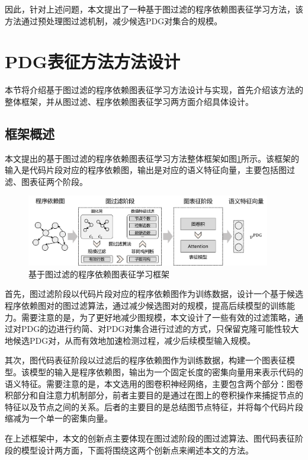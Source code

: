 因此，针对上述问题，本文提出了一种基于图过滤的程序依赖图表征学习方法，该方法通过预处理图过滤机制，减少候选PDG对集合的规模。

\section{PDG表征方法方法设计}
\label{sec:PDG}
本节将介绍基于图过滤的程序依赖图表征学习方法设计与实现，首先介绍该方法的整体框架，并从图过滤、程序依赖图表征学习两方面介绍具体设计。 

\subsection{框架概述}
\label{subsec:PDGOverview}
本文提出的基于图过滤的程序依赖图表征学习方法整体框架如图\ref{fig:pdgframework}所示。该框架的输入是代码片段对应的程序依赖图，输出是对应的语义特征向量，主要包括图过滤、图表征两个阶段。

\begin{figure}[H]
  \centering
  \includegraphics[width=0.95\textwidth]{figures/pdgframework.png}
  \caption{基于图过滤的程序依赖图表征学习框架}\label{fig:pdgframework}
\end{figure}

首先，图过滤阶段以代码片段对应的程序依赖图作为训练数据，设计一个基于候选程序依赖图对的图过滤算法，通过减少候选图对的规模，提高后续模型的训练能力。需要注意的是，为了更好地减少图规模，本文设计了一些有效的过滤策略，通过对PDG的边进行约简、对PDG对集合进行过滤的方式，只保留克隆可能性较大地候选PDG对，从而有效地加速检测过程，减少后续模型输入规模。

其次，图代码表征阶段以过滤后的程序依赖图作为训练数据，构建一个图表征模型。该模型的输入是程序依赖图，输出为一个固定长度的密集向量用来表示代码的语义特征。需要注意的是，本文选用的图卷积神经网络，主要包含两个部分：图卷积部分和自注意力机制部分，前者主要目的是通过在图上的卷积操作来捕捉节点的特征以及节点之间的关系。后者的主要目的是总结图节点特征，并将每个代码片段缩减为一个单一的密集向量。

在上述框架中，本文的创新点主要体现在图过滤阶段的图过滤算法、图代码表征阶段的模型设计两方面，下面将围绕这两个创新点来阐述本文的方法。



